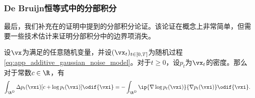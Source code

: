 \documentclass[../../book-main_zh.tex]{subfiles}
\begin{document}
\subsubsection{De Bruijn恒等式中的分部积分}

最后，我们补充在的证明中提到的分部积分论证。该论证在概念上非常简单，但需要一些技术估计来证明分部积分中的边界项消失。

\begin{lemma}\label{lem:diffusion_ibp}
    设\(\vx\)为满足的任意随机变量，并设\((\vx_{t})_{t \in [0, T]}\)为随机过程\eqref{eq:app_additive_gaussian_noise_model}。对于\(t \geq 0\)，设\(p_{t}\)为\(\vx_{t}\)的密度。那么对于常数\(c \in \R\)，有
    \begin{equation}
        \int_{\R^{D}}\Delta p_{t}(\vxi)[c + \log
        p_{t}(\vxi)]\odif{\vxi} = -\int_{\R^{D}}\ip{\nabla \log
        p_{t}(\vxi)}{\nabla p_{t}(\vxi)}\odif{\vxi}.
    \end{equation}
\end{lemma}
\end{document}

